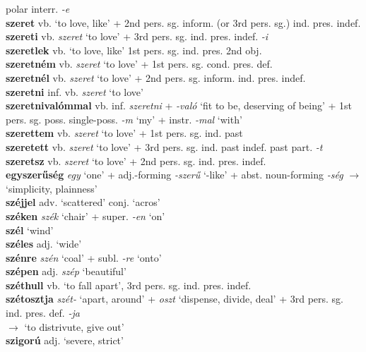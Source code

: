 \documentclass[11pt]{article}
\begin{document}
polar interr. \emph{-e} \\
\textbf{szeret} vb. `to love, like' + 2nd
pers. sg. inform. (or 3rd pers. sg.) ind. pres. indef. \\
\textbf{szereti} vb. \emph{szeret} `to love' + 3rd
pers. sg. ind. pres. indef. \emph{-i} \\
\textbf{szeretlek} vb. `to love, like' 1st pers. sg. ind. pres. 2nd
obj. \\
\textbf{szeretném} vb. \emph{szeret} `to love' + 1st
pers. sg. cond. pres. def. \\
\textbf{szeretnél} vb. \emph{szeret} `to love' + 2nd
pers. sg. inform. ind. pres. indef. \\
\textbf{szeretni} inf. vb. \emph{szeret} `to love' \\
\textbf{szeretnivalómmal} vb. inf. \emph{szeretni} + \emph{-való} `fit
to be, deserving of being' + 1st
pers. sg. poss. single\hyp{}poss. \emph{-m} `my' + instr. \emph{-mal} `with' \\
\textbf{szerettem} vb. \emph{szeret} `to love' + 1st
pers. sg. ind. past \\
\textbf{szeretett} vb. \emph{szeret} `to love' + 3rd
pers. sg. ind. past indef. \textbar\textbar{} past part. \emph{-t} \\
\textbf{szeretsz} vb. \emph{szeret} `to love' + 2nd
pers. sg. ind. pres. indef. \\
\textbf{egyszerűség} \emph{egy} `one' +
adj.\hyp{}forming \emph{-szerű} `-like' + abst. noun\hyp{}forming
  \emph{-ség} $\rightarrow$ `simplicity, plainness' \\
\textbf{széjjel} adv. `scattered' \textbar\textbar{} conj. `acros' \\
\textbf{széken} \emph{szék} `chair' + super. \emph{-en} `on' \\
\textbf{szél} `wind' \\
\textbf{széles} adj. `wide' \\
\textbf{szénre} \emph{szén} `coal' + subl. \emph{-re} `onto' \\
\textbf{szépen} adj. \emph{szép} `beautiful' \\
\textbf{széthull} vb. `to fall apart', 3rd
pers. sg. ind. pres. indef. \\
\textbf{szétosztja} \emph{szét-} `apart, around'
+ \emph{oszt} `dispense, divide, deal' + 3rd
pers. sg. ind. pres. def. \emph{-ja} \\
$\rightarrow$ `to distrivute, give out' \\
\textbf{szigorú} adj. `severe, strict' \\
\end{document}

